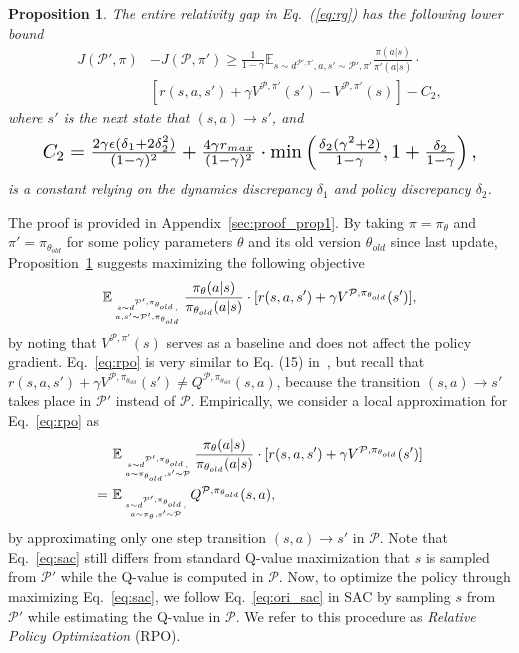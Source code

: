 \documentclass[letterpaper]{article} %
\def\E{{\mathbb{E}}}
\def\P{{\mathcal{P}}}
\newtheorem{proposition}[theorem]{Proposition}
\begin{document}
\begin{proposition}
\label{prop:1}
The entire relativity gap in Eq.~(\ref{eq:rg}) has the following lower bound
{\small
\begin{align}
J(\P',\pi)&-J(\P,\pi')\geq 
\frac{1}{1-\gamma}\E_{s\sim d^{\P',\pi'} ,a,s'\sim\P',\pi'}\frac{\pi(a|s)}{\pi'(a|s)}\cdot \nonumber
\\
&[r(s,a,s')+\gamma V^{\P,\pi'}(s')-V^{\P,\pi'}(s)]
-C_2,
\end{align}
}where $s'$ is the next state that $(s,a)\xrightarrow{}s'$, and
\begin{equation}
\begin{aligned}
\resizebox{0.9\hsize}{!}{$
C_2=\frac{2\gamma\epsilon(\delta_1+2\delta_2^2)}{(1-\gamma)^2}
+
\frac{4\gamma r_{max}}{(1-\gamma)^2}
\cdot\min
\left(
\frac{\delta_2(\gamma^2+2)}{1-\gamma}, 1+\frac{\delta_2}{1-\gamma}
\right),
$}
\end{aligned}
\end{equation}
is a constant relying on the dynamics discrepancy $\delta_1$ and policy discrepancy $\delta_2$.
\end{proposition}
The proof is provided in Appendix~\ref{sec:proof_prop1}.
By taking $\pi=\pi_{\theta}$ and $\pi'=\pi_{\theta_{old}}$ for some policy parameters $\theta$ and its old version $\theta_{old}$ since last update, Proposition~\ref{prop:1} suggests maximizing the following objective
{\small
\begin{align}
\E_{
\atop{
s\sim d^{\P',\pi_{\theta_{old}}},
\atop a,s'\sim\P',\pi_{\theta_{old}}}
}
\frac{\pi_{\theta}(a|s)}{\pi_{\theta_{old}}(a|s)}\cdot
[r(s,a,s')+\gamma V^{\P,\pi_{\theta_{old}}}(s')],
\label{eq:rpo}
\end{align}
}by noting that $V^{\P,\pi'}(s)$ serves as a baseline and does not affect the policy gradient.
Eq.~\eqref{eq:rpo} is very similar to Eq. (15) in~\cite{schulman2015trust}, but
recall that $r(s,a,s')+\gamma V^{\P,\pi_{\theta_{old}}}(s')
\neq Q^{\P,\pi_{\theta_{old}}}(s,a)$,
because the transition $(s,a)\xrightarrow{}s'$ takes place in $\P'$ instead of $\P$. 
Empirically, we consider a local approximation for Eq.~\eqref{eq:rpo} as
{\small
\begin{align}
&\E_{
\atop{s\sim d^{\P',\pi_{\theta_{old}}},
\atop a\sim\pi_{\theta_{old}},
s'\sim\P}
}
\frac{\pi_{\theta}(a|s)}{\pi_{\theta_{old}}(a|s)}\cdot
[r(s,a,s')+\gamma V^{\P,\pi_{\theta_{old}}}(s')]
\nonumber
\\
=\ &\E_{
\atop{s\sim d^{\P',\pi_{\theta_{old}}},
\atop a\sim\pi_{\theta},
s'\sim\P}
}
Q^{\P,\pi_{\theta_{old}}}(s,a),
\label{eq:sac}
\end{align}
}by approximating only one step transition $(s,a)\xrightarrow{}s'$ in $\P$. Note that Eq.~\eqref{eq:sac} still differs from standard Q-value maximization that $s$ is sampled from $\P'$ while the Q-value is computed in $\P$. 
Now, to optimize the policy through maximizing Eq.~\eqref{eq:sac}, we follow Eq.~\eqref{eq:ori_sac} in SAC by sampling $s$ from $\P'$ while estimating the Q-value in $\P$.
We refer to this procedure as \emph{Relative Policy Optimization} (RPO).
\end{document}
